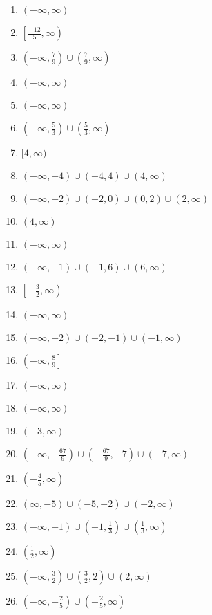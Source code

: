 \begin{multicols}{2}
\begin{enumerate}
	\item $(-\infty, \infty)$
	\item $\left[\frac{-12}{5}, \infty\right)$
	\item $\left(-\infty, \frac{7}{9}\right) \cup \left(\frac{7}{9}, \infty\right)$
	\item $(-\infty, \infty)$
	\item $(-\infty, \infty)$
	\item $\left(-\infty, \frac{5}{3}\right) \cup \left(\frac{5}{3}, \infty\right)$
	\item $[4, \infty)$
	\item $(-\infty, -4) \cup (-4, 4) \cup (4, \infty)$
	\item $(-\infty, -2) \cup (-2, 0) \cup (0,2) \cup (2, \infty)$
	\item $(4, \infty)$
	\item $(-\infty, \infty)$
	\item $(-\infty, -1) \cup (-1, 6) \cup (6, \infty)$
	\item $\left[-\frac{3}{2}, \infty\right)$
	\item $(-\infty, \infty)$
	\item $(-\infty, -2) \cup (-2,-1) \cup (-1,\infty)$
	\item $\left(-\infty, \frac{8}{9}\right]$
	\item $(-\infty, \infty)$
    \item $(-\infty, \infty)$
    \item $(-3, \infty)$
    \item $\left(-\infty,-\frac{67}{9}\right) \cup \left(-\frac{67}{9},-7\right) \cup (-7,\infty)$
    \item $\left(-\frac{4}{5}, \infty\right)$
    \item $(\infty,-5) \cup (-5,-2) \cup (-2,\infty)$
    \item $(-\infty, -1) \cup (-1, \frac{1}{3}) \cup (\frac{1}{3}, \infty)$
    \item $(\frac{1}{2}, \infty)$
    \item $\left(-\infty, \frac{3}{2}\right) \cup \left(\frac{3}{2}, 2\right) \cup (2, \infty)$
    \item $\left(-\infty, -\frac{2}{5}\right) \cup \left(-\frac{2}{5}, \infty\right)$
\end{enumerate}
\end{multicols}

